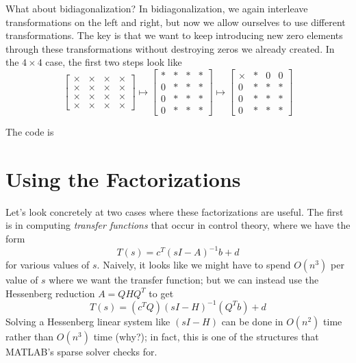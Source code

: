 \documentclass[12pt, leqno]{article}
\begin{document}
What about bidiagonalization?  In bidiagonalization, we again
interleave transformations on the left and right, but now we allow
ourselves to use different transformations.  The key is that we
want to keep introducing new zero elements through these
transformations without destroying zeros we already created.
In the $4 \times 4$ case, the first two steps look like
\[
\begin{bmatrix}
  \times & \times & \times & \times \\
  \times & \times & \times & \times \\
  \times & \times & \times & \times \\
  \times & \times & \times & \times
\end{bmatrix} \mapsto
\begin{bmatrix}
  * & * & * & * \\
  0 & * & * & * \\
  0 & * & * & * \\
  0 & * & * & *
\end{bmatrix} \mapsto
\begin{bmatrix}
  \times & * & 0 & 0 \\
  0 & * & * & * \\
  0 & * & * & * \\
  0 & * & * & *
\end{bmatrix}
\]

The code is


\section{Using the Factorizations}

Let's look concretely at two cases where these factorizations are
useful.  The first is in computing {\em transfer functions}
that occur in control theory, where we have the form
\[
  T(s) = c^T (sI-A)^{-1} b + d
\]
for various values of $s$.  Naively, it looks like we might have
to spend $O(n^3)$ per value of $s$ where we want the transfer
function; but we can instead use the Hessenberg reduction
$A = Q H Q^T$ to get
\[
  T(s) = (c^T Q) (sI-H)^{-1} (Q^T b) + d
\]
Solving a Hessenberg linear system like $(sI-H)$ can be done in
$O(n^2)$ time rather than $O(n^3)$ time (why?); in fact, this is one
of the structures that MATLAB's sparse solver checks for.
\end{document}
